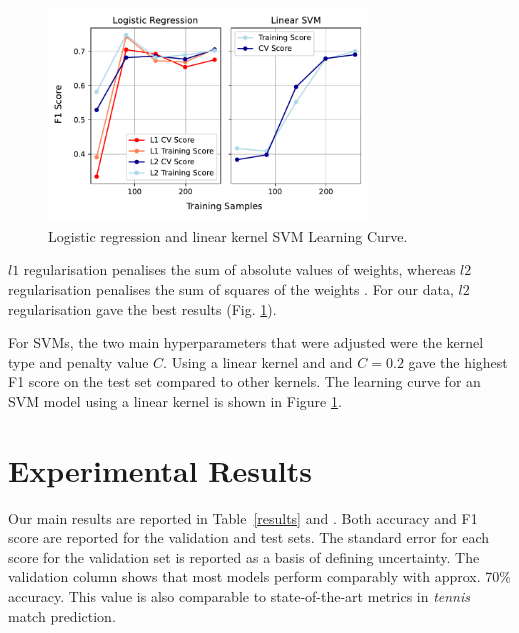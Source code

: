 \begin{figure}[H]
\includegraphics[width=8.5cm]{plots/learningcurves.pdf}
\caption{Logistic regression and linear kernel SVM Learning Curve.}
\label{fig:learningcurve}
\centering
\end{figure}

$l1$ regularisation penalises the sum of absolute values of weights, whereas $l2$ regularisation penalises the sum of squares of the weights \cite{ahmadian1998regularisation}. For our data, $l2$ regularisation gave the best results (Fig. \ref{fig:learningcurve}).


For SVMs, the two main hyperparameters that were adjusted were the kernel type and penalty value $C$. Using a linear kernel and and $C=0.2$ gave the highest F1 score on the test set compared to other kernels. The learning curve for an SVM model using a linear kernel is shown in Figure \ref{fig:learningcurve}.

\section{Experimental Results} \label{experresults}
Our main results are reported in Table~\ref{results} and .
Both accuracy and F1 score are reported for the validation and test sets. The standard error for each score for the validation set is reported as a basis of defining uncertainty. The validation column shows that most models perform comparably with approx. 70\% accuracy. This value is also comparable to state-of-the-art metrics in \textit{tennis} match prediction.

